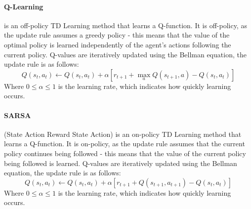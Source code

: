 \paragraph*{Q-Learning} \cite{Watkins:1989, journals/ml/WatkinsD92} is an off-policy TD Learning method that learns a Q-function. It is off-policy, as the update rule assumes a greedy policy - this means that the value of the optimal policy is learned independently of the agent's actions following the current policy. Q-values are iteratively updated using the Bellman equation, the update rule is as follows:
\begin{equation}
\label{eqn:qlearningupdate}
Q(s_t,a_t) \leftarrow Q(s_t,a_t) + \alpha[r_{t+1} + \max_aQ(s_{t+1}, a) -Q(s_t,a_t)]
\end{equation}
Where $0 \le \alpha \le 1$ is the learning rate, which indicates how quickly learning occurs.
\paragraph*{SARSA} (State Action Reward State Action) \cite{rummery:cuedtr94} is an on-policy TD Learning method that learns a Q-function. It is on-policy, as the update rule assumes that the current policy continues being followed - this means that the value of the current policy being followed is learned. Q-values are iteratively updated using the Bellman equation, the update rule is as follows:
\begin{equation}
\label{eqn:sarsaupdate}
Q(s_t, a_t) \leftarrow Q(s_t, a_t) + \alpha[r_{t+1} + Q(s_{t+1}, a_{t+1})-Q(s_t, a_t)]
\end{equation}
Where $0 \le \alpha \le 1$ is the learning rate, which indicates how quickly learning occurs.
